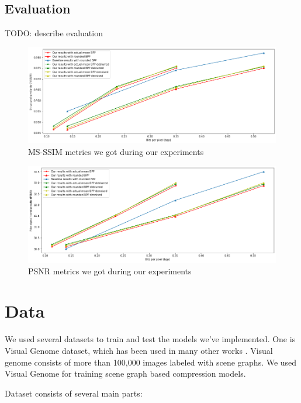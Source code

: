 \section{Evaluation}

TODO: describe evaluation

\begin{figure}[!ht]
    \centering
    \includegraphics[width=\textwidth]{figure/mssim.png}
    \caption{MS-SSIM metrics we got during our experiments}
    \label{mssim}
\end{figure}

\begin{figure}[!ht]
    \centering
    \includegraphics[width=\textwidth]{figure/psnr.png}
    \caption{PSNR metrics we got during our experiments}
    \label{psnr}
\end{figure}

\chapter{Data}
\label{section:data}

We used several datasets to train and test the models we've implemented. One is Visual Genome dataset, which has been used in many other works \cite{Krishna_Zhu_Groth_Johnson_Hata_Kravitz_Chen_Kalantidis_Li_Shamma_etal_2016}. Visual genome consists of more than 100,000 images labeled with scene graphs. We used Visual Genome for training scene graph based compression models.

Dataset consists of several main parts:

